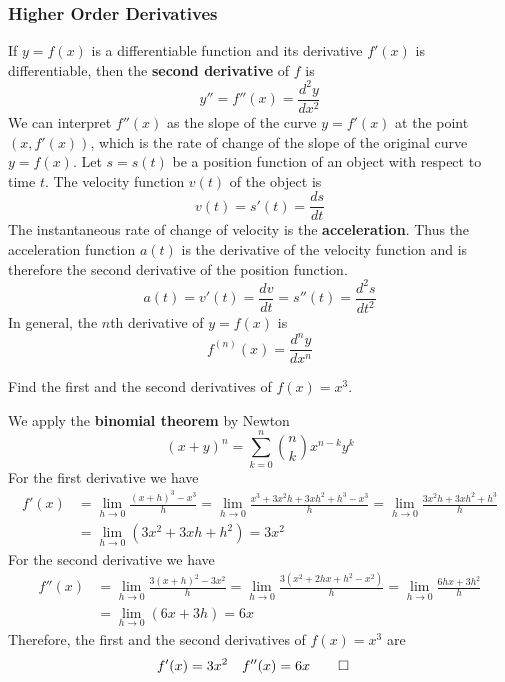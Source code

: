 \subsubsection{Higher Order Derivatives}
 If \(y=f(x)\) is a differentiable function and its derivative \(f'(x)\) is differentiable,
then the \textbf{second derivative} of \(f\) is
\[y''=f''(x)=\frac{d^2y}{dx^2}\]
We can interpret \(f''(x)\) as the slope of the curve \(y=f'(x)\) at the point
\((x,f'(x))\), which is the rate of change of the slope of the original curve \(y=f(x)\).
Let \(s=s(t)\) be a position function of an object with respect to time \(t\).
The velocity function \(v(t)\) of the object is \[v(t)=s'(t)=\frac{ds}{dt}\]
The instantaneous rate of change of velocity is the \textbf{acceleration}.
Thus the acceleration function \(a(t)\) is the derivative of the velocity function and
is therefore the second derivative of the position function.
\[a(t)=v'(t)=\frac{dv}{dt}=s''(t)=\frac{d^2s}{dt^2}\]
In general, the \(n\)th derivative of \(y=f(x)\) is
\[f^{(n)}(x)=\frac{d^ny}{dx^n}\]
\begin{problem}
    Find the first and the second derivatives of \(f(x)=x^3\).
\end{problem}
\begin{solution}
    We apply the \textbf{binomial theorem} by Newton
    \[(x+y)^n=\sum_{k=0}^n \binom{n}{k}x^{n-k}y^k\]
    For the first derivative we have
    \begin{align*}
        f'(x)&=\lim_{h\to 0}\frac{(x+h)^3-x^3}{h}=\lim_{h\to 0}
        \frac{x^3+3x^2h+3xh^2+h^3-x^3}{h}=\lim_{h\to 0}\frac{3x^2h+3xh^2+h^3}{h} \\
        &=\lim_{h\to 0}(3x^2+3xh+h^2)=3x^2
    \end{align*}
    For the second derivative we have
    \begin{align*}
        f''(x)&=\lim_{h\to 0}\frac{3(x+h)^2-3x^2}{h}
        =\lim_{h\to 0}\frac{3(x^2+2hx+h^2-x^2)}{h}=\lim_{h\to 0}\frac{6hx+3h^2}{h} \\
        &=\lim_{h\to 0}(6x+3h)=6x
    \end{align*}
    Therefore, the first and the second derivatives of \(f(x)=x^3\) are
    \begin{align*}
        &f'(x)=3x^2&f''(x)=6x&\qedhere
    \end{align*}
\end{solution}